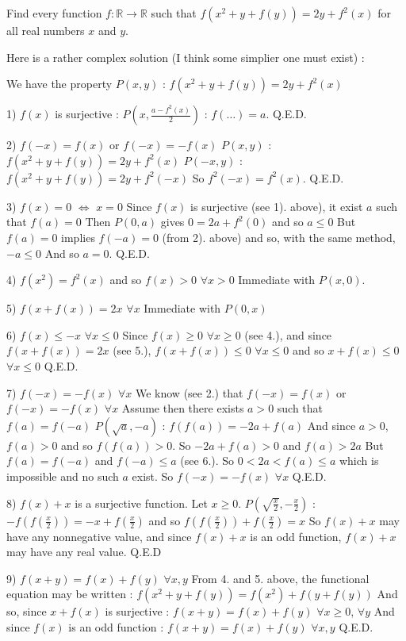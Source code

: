 \begin{mysolution}
	\begin{tcolorbox}Find every function $ f : \mathbb{R}\rightarrow \mathbb{R}$ such that $ f(x^{2}+y+f(y)) = 2y+f^{2}(x)$ for all real numbers $ x$ and $ y$.\end{tcolorbox}

Here is a rather complex solution (I think some simplier one must exist) :

We have the property $ P(x,y)$ : $ f(x^{2}+y+f(y)) = 2y+f^{2}(x)$

1) $ f(x)$ is surjective :
$ P(x,\frac{a-f^{2}(x)}{2})$ : $ f(\ldots)=a$. Q.E.D.

2) $ f(-x)=f(x)$ or $ f(-x)=-f(x)$
$ P(x,y)$ : $ f(x^{2}+y+f(y)) = 2y+f^{2}(x)$
$ P(-x,y)$ : $ f(x^{2}+y+f(y)) = 2y+f^{2}(-x)$
So $ f^{2}(-x)=f^{2}(x)$.
Q.E.D.

3) $ f(x)=0$ $ \Leftrightarrow$ $ x=0$
Since $ f(x)$ is surjective (see 1). above), it exist $ a$ such that $ f(a)=0$
Then $ P(0,a)$ gives $ 0 = 2a+f^{2}(0)$ and so $ a\leq 0$
But $ f(a)=0$ implies $ f(-a)=0$ (from 2). above) and so, with the same method, $ -a \leq 0$
And so $ a=0$.
Q.E.D.

4) $ f(x^{2})=f^{2}(x)$ and so $ f(x)>0$ $ \forall x>0$
Immediate with $ P(x,0)$.

5) $ f(x+f(x))=2x$ $ \forall x$
Immediate with $ P(0,x)$

6) $ f(x)\leq-x$ $ \forall x\leq 0$
Since $ f(x)\geq 0$ $ \forall x\geq 0$ (see 4.), and since $ f(x+f(x))=2x$ (see 5.), $ f(x+f(x))\leq 0$ $ \forall x\leq 0$ and so $ x+f(x)\leq 0$ $ \forall x\leq 0$
Q.E.D.

7) $ f(-x)=-f(x)$ $ \forall x$
We know (see 2.) that $ f(-x)=f(x)$ or $ f(-x)=-f(x)$ $ \forall x$
Assume then there exists $ a>0$ such that $ f(a)=f(-a)$
$ P(\sqrt{a},-a)$ : $ f(f(a)) =-2a+f(a)$
And since $ a>0$, $ f(a)>0$ and so $ f(f(a))>0$. So $ -2a+f(a)>0$ and $ f(a)>2a$
But $ f(a)=f(-a)$ and $ f(-a)\leq a$ (see 6.). So $ 0<2a<f(a)\leq a$ which is impossible and no such $ a$ exist.
So $ f(-x)=-f(x)$ $ \forall x$
Q.E.D.

8) $ f(x)+x$ is a surjective function.
Let $ x\geq 0$. $ P(\sqrt{\frac{x}{2}},-\frac{x}{2})$ : $ -f(f(\frac{x}{2})) =-x+f(\frac{x}{2})$ and so $ f(f(\frac{x}{2}))+f(\frac{x}{2})= x$
So $ f(x)+x$ may have any nonnegative value, and since $ f(x)+x$ is an odd function, $ f(x)+x$ may have any real value.
Q.E.D

9) $ f(x+y)=f(x)+f(y)$ $ \forall x,y$
From 4. and 5. above, the functional equation may be written : $ f(x^{2}+y+f(y)) = f(x^{2})+f(y+f(y))$
And so, since $ x+f(x)$ is surjective : $ f(x+y)=f(x)+f(y)$ $ \forall x\geq 0$, $ \forall y$
And since $ f(x)$ is an odd function : $ f(x+y)=f(x)+f(y)$ $ \forall x,y$
Q.E.D.


\end{mysolution}
